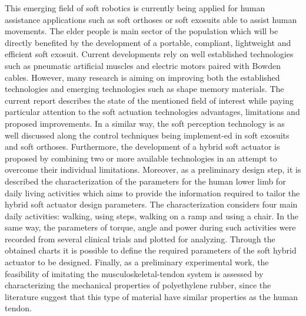 


\begin{abstracts}        %

\setlength{\parindent}{17.62482pt}
\setlength{\parskip}{0.0pt plus 1.0pt}
	
This emerging field of soft robotics is currently being applied for human assistance applications such as soft orthoses or soft exosuits able to assist human movements. The elder people is main sector of the population which will be directly benefited by the development of a portable, compliant, lightweight and efficient soft exosuit. Current developments rely on well established technologies such as pneumatic artificial muscles and electric motors paired with Bowden cables. However, many research is aiming on improving both the established technologies and emerging technologies such as shape memory materials. The current report describes the state of the mentioned field of interest while paying particular attention to the soft actuation technologies advantages, limitations and proposed improvements. In a similar way, the soft perception technology is as well discussed along the control techniques being implement-ed in soft exosuits and soft orthoses. Furthermore, the development of a hybrid soft actuator is proposed by combining two or more available technologies in an attempt to overcome their individual limitations. Moreover, as a preliminary design step, it is described the characterization of the parameters for the human lower limb for daily living activities which aims to provide the information required to tailor the hybrid soft actuator design parameters. The characterization considers four main daily activities: walking, using steps, walking on a ramp and using a chair. In the same way, the parameters of torque, angle and power during such activities were recorded from several clinical trials and plotted for analyzing. Through the obtained charts it is possible to define the required parameters of the soft hybrid actuator to be designed. Finally, as a preliminary experimental work, the feasibility of imitating the musculoskeletal-tendon system is assessed by characterizing the mechanical properties of polyethylene rubber, since the literature suggest that this type of material have similar properties as the human tendon.

\end{abstracts}


